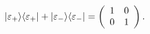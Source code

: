 \begin{equation}
|\varepsilon_+\rangle\langle\varepsilon_+|+|\varepsilon_-\rangle\langle
\varepsilon_-|=\left(\begin{array}{cc} 1 & 0 \cr 0 &
1\end{array}\right). \label{e27}
\end{equation}

